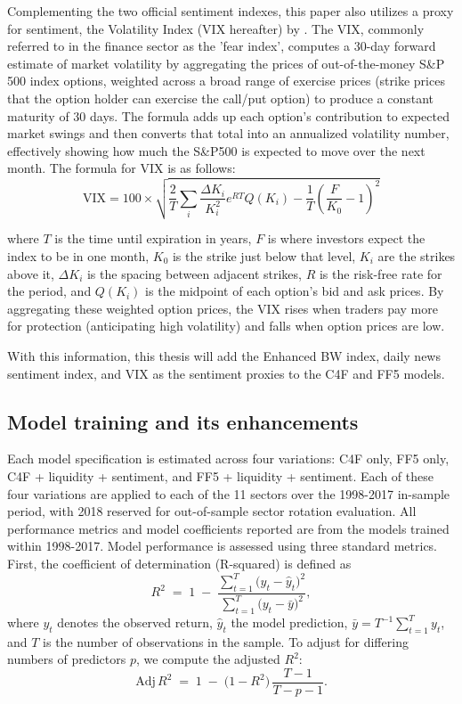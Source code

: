 Complementing the two official sentiment indexes, this paper also utilizes a proxy for sentiment, the Volatility Index (VIX hereafter) by . The VIX, commonly referred to in the finance sector as the 'fear index', computes a 30-day forward estimate of market volatility by aggregating the prices of out-of-the-money S\&P 500 index options, weighted across a broad range of exercise prices (strike prices that the option holder can exercise the call/put option) to produce a constant maturity of 30 days. The formula adds up each option's contribution to expected market swings and then converts that total into an annualized volatility number, effectively showing how much the S\&P500 is expected to move over the next month. The formula for VIX is as follows:
\begin{equation}
    \label{eq:vix}
    \text{VIX} = 100 \times \sqrt{\frac{2}{T} \sum_i \frac{\Delta K_i}{K_i^2} e^{RT} Q(K_i) - \frac{1}{T} \left(\frac{F}{K_0} - 1\right)^2}
\end{equation}

where $T$ is the time until expiration in years, $F$ is where investors expect the index to be in one month, $K_0$ is the strike just below that level, $K_i$ are the strikes above it, $\Delta K_i$ is the spacing between adjacent strikes, $R$ is the risk-free rate for the period, and $Q(K_i)$ is the midpoint of each option's bid and ask prices. By aggregating these weighted option prices, the VIX rises when traders pay more for protection (anticipating high volatility) and falls when option prices are low.

With this information, this thesis will add the Enhanced BW index, daily news sentiment index, and VIX as the sentiment proxies to the C4F and FF5 models.

\subsection{Model training and its enhancements}

Each model specification is estimated across four variations: C4F only, FF5 only, C4F + liquidity + sentiment, and FF5 + liquidity + sentiment. Each of these four variations are applied to each of the 11 sectors over the 1998-2017 in-sample period, with 2018 reserved for out-of-sample sector rotation evaluation. All performance metrics and model coefficients reported are from the models trained within 1998-2017. Model performance is assessed using three standard metrics.  First, the coefficient of determination (R-squared) is defined as  
\begin{equation}
\label{eq:rsquared}
R^2 \;=\; 1 \;-\; \frac{\sum_{t=1}^{T}\bigl(y_{t}-\hat y_{t}\bigr)^2}{\sum_{t=1}^{T}\bigl(y_{t}-\bar y\bigr)^2},
\end{equation}  
where \(y_t\) denotes the observed return, \(\hat y_t\) the model prediction, \(\bar y = T^{-1}\sum_{t=1}^T y_t\), and \(T\) is the number of observations in the sample.  To adjust for differing numbers of predictors \(p\), we compute the adjusted \(R^2\):  
\begin{equation}
\label{eq:adjrsquared}
\mathrm{Adj}\,R^2 \;=\; 1 \;-\; \bigl(1 - R^2\bigr)\,\frac{T - 1}{T - p - 1}.
\end{equation}  

